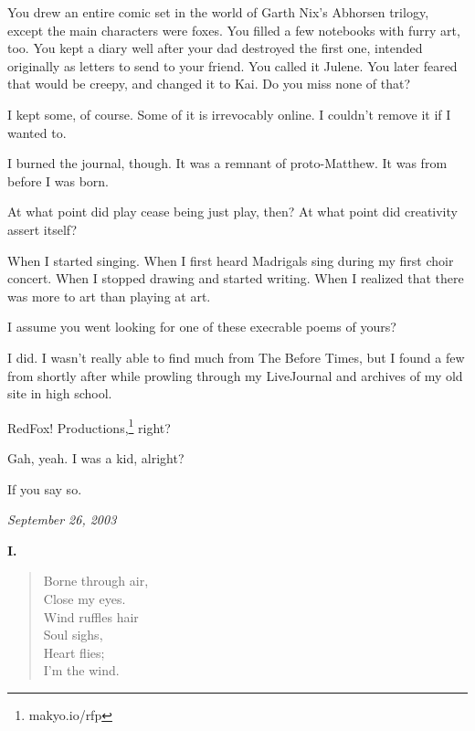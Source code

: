 \begin{paracol}{2}
\begin{leftcolumn}
\begin{ally}
You drew an entire comic set in the world of Garth Nix's Abhorsen trilogy, except the main characters were foxes. You filled a few notebooks with furry art, too. You kept a diary well after your dad destroyed the first one, intended originally as letters to send to your friend. You called it Julene. You later feared that would be creepy, and changed it to Kai. Do you miss none of that?
\end{ally}
I kept some, of course. Some of it is irrevocably online. I couldn't remove it if I wanted to.

I burned the journal, though. It was a remnant of proto-Matthew. It was from before I was born.

\begin{ally}
At what point did play cease being just play, then? At what point did creativity assert itself?
\end{ally}
When I started singing. When I first heard Madrigals sing during my first choir concert. When I stopped drawing and started writing. When I realized that there was more to art than playing at art.
\newpage

\begin{ally}
I assume you went looking for one of these execrable poems of yours?
\end{ally}
I did. I wasn't really able to find much from The Before Times, but I found a few from shortly after while prowling through my LiveJournal and archives of my old site in high school.

\begin{ally}
RedFox! Productions,\footnote{makyo.io/rfp} right?
\end{ally}
Gah, yeah. I was a kid, alright?

\begin{ally}
If you say so.
\end{ally}
\newpage
\end{leftcolumn}
\begin{rightcolumn*}
\emph{September 26, 2003}
\end{rightcolumn*}
\begin{leftcolumn}
\textbf{I.}
\begin{verse}
  Borne through air,\\
\vin   Close my eyes.\\
  Wind ruffles hair\\
\vin   Soul sighs,\\
\vin   Heart flies;\\
  I’m the wind.


\end{verse}
\end{leftcolumn}
\end{paracol}
